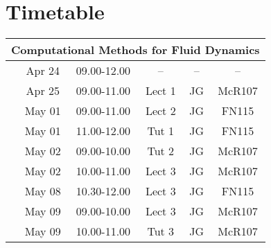 \documentclass[11pt,oneside,a4paper]{article}
\begin{document}
\begin{enumerate}[{\bf Lecture 1}]
\begin{comment}
\item{Root-Finding Methods for Nonlinear Equations}
\begin{enumerate}
\item Bisection method;
\item Secant method;
\item Newton's method;
\item Convergence analysis.
\end{enumerate} 
\end{comment}


\end{enumerate}

\section{Timetable}


\begin{center}
\begin{tabular}{||c||c|c|c|c|c||}
\hline\hline
\multicolumn{6}{||c||}{Computational Methods for Fluid Dynamics}\\\hline\hline
\multirow{3}{*}{\color{red}{Week 41}} & Apr 24   & 09.00-12.00 & --     & --  & --    \\
                                      & Apr 25   & 09.00-11.00 & Lect 1 & JG  & McR107 \\
\hline\hline
\multirow{3}{*}{\color{red}{Week 42}} & May 01   & 09.00-11.00 & Lect 2 & JG  & FN115  \\
                                      & May 01   & 11.00-12.00 & Tut 1  & JG  & FN115  \\
                                      & May 02   & 09.00-10.00 & Tut 2  & JG  & McR107 \\
                                      & May 02   & 10.00-11.00 & Lect 3 & JG  & McR107 \\
\hline\hline
\multirow{3}{*}{\color{red}{Week 43}} & May 08   & 10.30-12.00 & Lect 3 & JG  & FN115  \\
                                      & May 09   & 09.00-10.00 & Lect 3 & JG  & McR107 \\
                                      & May 09   & 10.00-11.00 & Tut 3  & JG  & McR107 \\

\hline\hline

\end{tabular}
\end{center}
\end{document}

